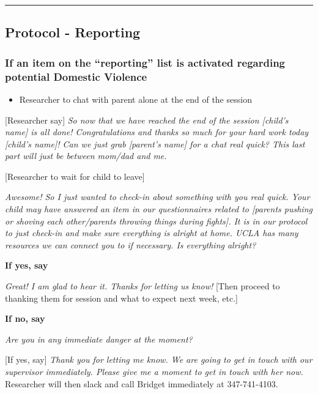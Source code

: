 \documentclass[]{book}
\providecommand{\tightlist}{%
  \setlength{\itemsep}{0pt}\setlength{\parskip}{0pt}}
\begin{document}
\begin{center}\rule{0.5\linewidth}{0.5pt}\end{center}

\hypertarget{protocol---reporting-1}{%
\subsection{Protocol - Reporting}\label{protocol---reporting-1}}

\hypertarget{if-an-item-on-the-reporting-list-is-activated-regarding-potential-domestic-violence-1}{%
\subsubsection{If an item on the ``reporting'' list is activated regarding potential Domestic Violence}\label{if-an-item-on-the-reporting-list-is-activated-regarding-potential-domestic-violence-1}}

\begin{itemize}
\tightlist
\item
  Researcher to chat with parent alone at the end of the session
\end{itemize}

{[}Researcher say{]} \emph{So now that we have reached the end of the session {[}child's name{]} is all done! Congratulations and thanks so much for your hard work today {[}child's name{]}! Can we just grab {[}parent's name{]} for a chat real quick? This last part will just be between mom/dad and me.}

{[}Researcher to wait for child to leave{]}

\emph{Awesome! So I just wanted to check-in about something with you real quick. Your child may have answered an item in our questionnaires related to {[}parents pushing or shoving each other/parents throwing things during fights{]}. It is in our protocol to just check-in and make sure everything is alright at home. UCLA has many resources we can connect you to if necessary. Is everything alright?}

\textbf{If yes, say}

\emph{Great! I am glad to hear it. Thanks for letting us know!} {[}Then proceed to thanking them for session and what to expect next week, etc.{]}

\textbf{If no, say}

\emph{Are you in any immediate danger at the moment?}

{[}If yes, say{]} \emph{Thank you for letting me know. We are going to get in touch with our supervisor immediately. Please give me a moment to get in touch with her now.} Researcher will then slack and call Bridget immediately at 347-741-4103.
\end{document}
